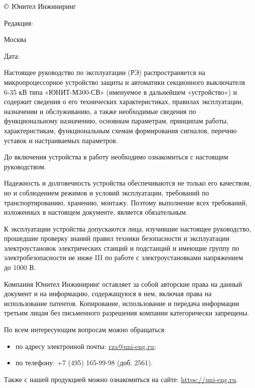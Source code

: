 \pagestyle{fancy}
\fancyhf{}
\renewcommand{\headrulewidth}{1pt}
\lhead{\color{black}{ЮТКБ.656122.609 РЭ4 Редакция \rev~от~\revdate}}
\rfoot{{\thepage}}
\renewcommand{\footrulewidth}{1pt}


\pagecolor{white}

\noindent
$\copyright$ \the\year{} Юнител Инжиниринг
\hfill
\parbox{0.3\textwidth}{\raggedleft Редакция: \textcolor{unigray}{\rev}}

\vskip 3mm
\noindent
Москва
\hfill
\parbox{0.3\textwidth}{\raggedleft Дата: \textcolor{unigray}{\revdate}}
\vskip 8mm

\vskip 10mm

\par
Настоящее руководство по эксплуатации (РЭ) распространяется на микропроцессорное устройство защиты и автоматики секционного выключателя 6-35 кВ типа «ЮНИТ-М300-СВ» (именуемое в дальнейшем «устройство») и содержит сведения о его технических характеристиках, правилах эксплуатации, назначении и обслуживанию, а также необходимые сведения по функциональному назначению, основным параметрам, принципам работы, характеристикам, функциональным схемам формирования сигналов, перечню уставок и настраиваемых параметров.
\medskip
\par
До включения устройства в работу необходимо ознакомиться с настоящим руководством.
\medskip
\par
Надежность и долговечность устройства обеспечиваются не только его качеством, но и соблюдением режимов и условий эксплуатации, требований по транспортированию, хранению, монтажу. Поэтому выполнение всех требований, изложенных в настоящем документе, является обязательным. 
\medskip
\par
К эксплуатации устройства допускаются лица, изучившие настоящее руководство, прошедшие проверку знаний правил техники безопасности и эксплуатации электроустановок электрических станций и подстанций и имеющие группу по электробезопасности не ниже III по работе с электроустановками напряжением до 1000 В.


\vskip 75mm
\par
Компания Юнител Инжиниринг оставляет за собой авторские права на данный документ и на информацию, содержащуюся в нем, включая права на использование патентов. Копирование, использование и передача информации третьим лицам без письменного разрешения компании категорически запрещены.

\vskip 10mm
\par
По всем интересующим вопросам можно обращаться:
\begin{itemize}
\item по адресу электронной почты: \href{mailto:rza@uni-eng.ru}{\color{uniblue}\uline{rza@uni-eng.ru}};
\item по телефону: +7 (495) 165-99-98 (доб. 2561).
\end{itemize}
Также с нашей продукцией можно ознакомиться на сайте: \href{https://uni-eng.ru}{\color{uniblue}\uline{https://uni-eng.ru}}.


